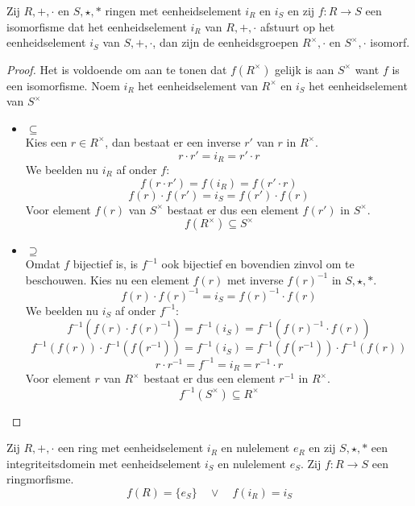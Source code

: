 \documentclass[main.tex]{subfiles}
\begin{document}
\begin{st}
  Zij $R,+,\cdot$ en $S,\star,*$ ringen met eenheidselement $i_{R}$ en $i_{S}$ en zij $f: R\rightarrow S$ een isomorfisme dat het eenheidselement $i_{R}$ van $R,+,\cdot$ afstuurt op het eenheidselement $i_{S}$ van $S,+,\cdot$, dan zijn de eenheidsgroepen $R^{\times},\cdot$ en $S^{\times},\cdot$ isomorf.

  \begin{proof}
    Het is voldoende om aan te tonen dat $f(R^{\times})$ gelijk is aan $S^{\times}$ want $f$ is een isomorfisme.
    Noem $i_{R}$ het eenheidselement van $R^{\times}$ en $i_{S}$ het eenheidselement van $S^{\times}$
    \begin{itemize}
    \item $\subseteq$\\
      Kies een $r\in R^{\times}$, dan bestaat er een inverse $r'$ van $r$ in $R^{\times}$.
      \[ r\cdot r' = i_{R} = r' \cdot r \]
      We beelden nu $i_{R}$ af onder $f$:
      \[ f(r\cdot r') = f(i_{R}) = f(r' \cdot r) \]
      \[ f(r)\cdot f(r') = i_{S} = f(r') \cdot f(r)\]
      Voor element $f(r)$ van $S^{\times}$ bestaat er dus een element $f(r')$ in $S^{\times}$.
      \[ f(R^{\times}) \subseteq S^{\times} \]
    \item $\supseteq$\\
      Omdat $f$ bijectief is, is $f^{-1}$ ook bijectief en bovendien zinvol om te beschouwen.
      Kies nu een element $f(r)$ met inverse $f(r)^{-1}$ in $S,\star,*$.
      \[ f(r) \cdot f(r)^{-1} = i_{S} = f(r)^{-1} \cdot f(r) \]
     We beelden nu $i_{S}$ af onder $f^{-1}$:
     \[ f^{-1}(f(r) \cdot f(r)^{-1}) = f^{-1}(i_{S}) = f^{-1}(f(r)^{-1} \cdot f(r))\]
     \[ f^{-1}(f(r)) \cdot f^{-1}(f(r^{-1})) = f^{-1}(i_{S}) = f^{-1}(f(r^{-1})) \cdot f^{-1}(f(r))\]
     \[ r \cdot r^{-1} = f^{-1} = i_{R} = r^{-1} \cdot r \]
      Voor element $r$ van $R^{\times}$ bestaat er dus een element $r^{-1}$ in $R^{\times}$.
      \[ f^{-1}(S^{\times}) \subseteq R^{\times} \]
    \end{itemize}
  \end{proof}
\end{st}

\begin{pr}
  Zij $R,+,\cdot$ een ring met eenheidselement $i_{R}$ en nulelement $e_{R}$ en zij $S,\star,*$ een integriteitsdomein met eenheidselement $i_{S}$ en nulelement $e_{S}$.
  Zij $f: R \rightarrow S$ een ringmorfisme.
  \[ f(R) = \{e_{S}\} \quad\vee\quad f(i_{R}) = i_{S} \]
\end{pr}
\end{document}
